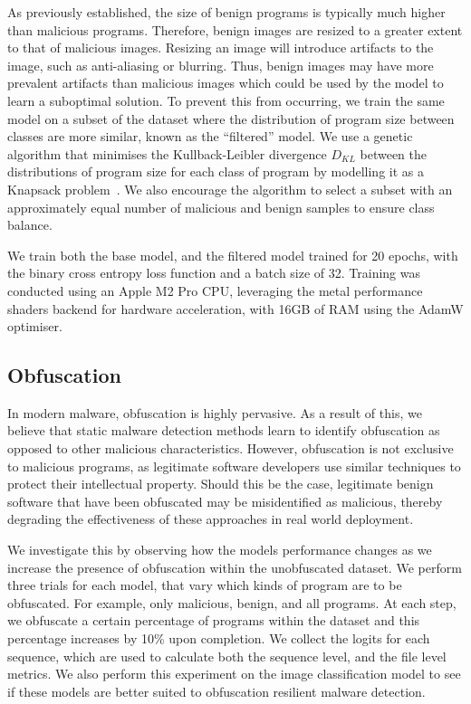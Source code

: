 \documentclass[conference,compsoc]{IEEEtran}
\begin{document}
As previously established, the size of benign programs is typically much higher than malicious programs. Therefore, benign images are resized to a greater extent to that of malicious images. Resizing an image will introduce artifacts to the image, such as anti-aliasing or blurring. Thus, benign images may have more prevalent artifacts than malicious images which could be used by the model to learn a suboptimal solution. To prevent this from occurring, we train the same model on a subset of the dataset where the distribution of program size between classes are more similar, known as the ``filtered'' model. We use a genetic algorithm that minimises the Kullback-Leibler divergence $D_{KL}$ between the distributions of program size for each class of program by modelling it as a Knapsack problem~\cite{khuriZeroOneMultiple1994}. We also encourage the algorithm to select a subset with an approximately equal number of malicious and benign samples to ensure class balance. 

We train both the base model, and the filtered model trained for 20 epochs, with the binary cross entropy loss function and a batch size of 32. Training was conducted using an Apple M2 Pro CPU, leveraging the metal performance shaders backend for hardware acceleration, with 16GB of RAM using the AdamW optimiser. 

\subsection{Obfuscation}

In modern malware, obfuscation is highly pervasive. As a result of this, we believe that static malware detection methods learn to identify obfuscation as opposed to other malicious characteristics. However, obfuscation is not exclusive to malicious programs, as legitimate software developers use similar techniques to protect their intellectual property. Should this be the case, legitimate benign software that have been obfuscated may be misidentified as malicious, thereby degrading the effectiveness of these approaches in real world deployment. 

We investigate this by observing how the models performance changes as we increase the presence of obfuscation within the unobfuscated dataset. We perform three trials for each model, that vary which kinds of program are to be obfuscated. For example, only malicious, benign, and all programs. At each step, we obfuscate a certain percentage of programs within the dataset and this percentage increases by 10\% upon completion. We collect the logits for each sequence, which are used to calculate both the sequence level, and the file level metrics. We also perform this experiment on the image classification model to see if these models are better suited to obfuscation resilient malware detection.
\end{document}

